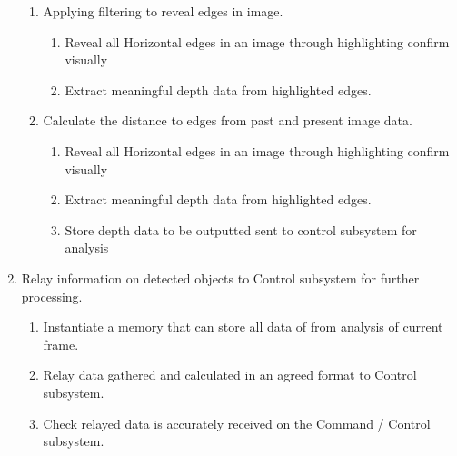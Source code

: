 \documentclass[10pt,twoside]{article}
\begin{document}
\begin{enumerate}
        \begin{enumerate}
            \itemsep-0.2em
            \item Applying filtering to reveal edges in image.
                \begin{enumerate}
                    \itemsep-0.2em
                    \item Reveal all Horizontal edges in an image through highlighting confirm visually
                    \item Extract meaningful depth data from highlighted edges. 
                \end{enumerate}
            \item Calculate the distance to edges from past and present image data.
                 \begin{enumerate}
                    \itemsep-0.2em
                    \item Reveal all Horizontal edges in an image through highlighting confirm visually
                    \item Extract meaningful depth data from highlighted edges. 
                    \item Store depth data to be outputted sent to control subsystem for analysis
                \end{enumerate}
        \end{enumerate}
  \item Relay information on detected objects to Control subsystem for further processing.
        \begin{enumerate}
            \itemsep-0.2em
            \item Instantiate a memory that can store all data of from analysis of current frame. 
            \item Relay data gathered and calculated in an agreed format to Control subsystem.
            \item Check relayed data is accurately received on the Command / Control subsystem. 
        \end{enumerate}
\end{enumerate}



\newpage
\end{document}
